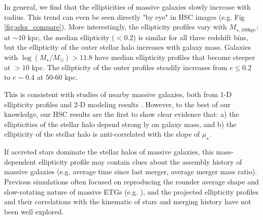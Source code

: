 \documentclass[a4paper,fleqn,usenatbib]{mnras}
\def\logms{{$\log (M_{\star}/M_{\odot})$}}
\def\mtot{{$M_{\star,100\mathrm{kpc}}$}}
\def\mden{{$\mu_{\star}$}}
\begin{document}
	In general, we find that the ellipticities of massive galaxies slowly increase with radius. This trend can even be seen directly "by eye" in HSC images (e.g. Fig \ref{fig:sdss_compare}). More interestingly, the ellipticity profiles vary with  \mtot{}: 
	at ${\sim} 10$ kpc, the median ellipticity ($< 0.2$) is similar for all three redshift bins,  but the ellipticity of the outer stellar halo increases with galaxy mass. Galaxies with  \logms{}$>11.8$ have median ellipticity profiles that become steeper at $>10$ kpc. The ellipticity of the outer profiles steadily increases from $e\le 0.2$ to $e{\sim} 0.4$ at 50-60 kpc.
    
	This is consistent with studies of nearby massive galaxies, both from 1-D 
	ellipticity profiles and 2-D modeling results \citep{Porter1991, Gonzalez2005, 
	Zibetti2005, Spavone2017; Huang2013a, Oh2017}. However,  to the best of our knowledge, our HSC results are the first to show  clear evidence that:  a) the ellipticities of the stellar halo  depend strong ly on galaxy mass, and b)  the ellipticity of the stellar halo is anti-correlated with the slope of \mden{}.
    
	If accreted stars dominate the stellar halos of massive galaxies, this 
	mass-dependent ellipticity profile may contain clues about the assembly history of massive galaxies (e.g. average time since last merger, 
	average merger mass ratio).
	Previous simulations often focused on reproducing the rounder average shape 
	and slow-rotating nature of massive ETGs (e.g. \citealt{Wu2014}), and the 
	projected ellipticity profiles and their correlations with the kinematic of 
	stars and merging history have not been well explored. 
   
\end{document}
